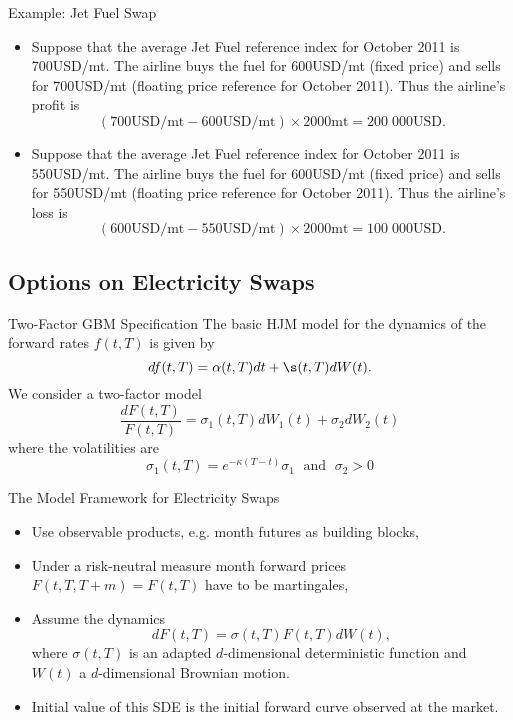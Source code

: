 {Example: Jet Fuel Swap}
\begin{itemize}
  \item<1-> Suppose that the average Jet Fuel reference index for October 2011 is 700USD/mt. The airline buys the fuel for 600USD/mt (fixed price) and sells for 700USD/mt (floating price reference for October 2011). Thus the airline's profit is
      $$(700\text{USD/mt} - 600\text{USD/mt})\times2000\text{mt} = 200\;000\text{USD}.$$
  \item<2-> Suppose that the average Jet Fuel reference index for October 2011 is 550USD/mt. The airline buys the fuel for 600USD/mt (fixed price) and sells for 550USD/mt (floating price reference for October 2011). Thus the airline's loss is
      $$(600\text{USD/mt} - 550\text{USD/mt})\times2000\text{mt} = 100\;000\text{USD}.$$
\end{itemize}



\subsection{Options on Electricity Swaps}



{Two-Factor GBM Specification}
The basic HJM model for the dynamics of the forward rates $f(t,T)$ is given by
$$
df(t,T) = \alpha(t,T) dt + \s(t,T) dW(t).
$$
We consider a two-factor model
$$
\frac{dF(t,T)}{F(t,T)}=\sigma_1(t,T)dW_1(t)+\sigma_2dW_2(t)
$$
where the volatilities are
$$
\sigma_1(t,T)=e^{-\kappa (T-t)}\sigma_1 \; \mbox{ and } \; \sigma_2>0
$$




{The Model Framework for Electricity Swaps}
\begin{itemize}
\item<1-> Use observable products, e.g. month futures as building blocks,
\item<2-> Under a risk-neutral measure month forward prices $F(t,T,T+m)=F(t,T)$ have to be martingales,
\item<3-> Assume the dynamics
$$dF(t,T)=\sigma(t,T)F(t,T)dW(t),$$
where $\sigma(t,T)$ is an adapted $d$-dimensional deterministic function and
$W(t)$ a $d$-dimensional Brownian motion.
\item<4-> Initial value of this SDE is the initial forward curve observed at the market.
\end{itemize}



